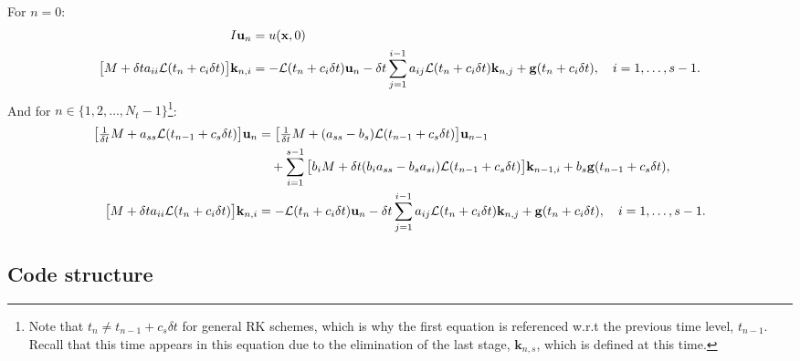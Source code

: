 \documentclass[a4paper,10pt]{article}
\begin{document}
\noindent For $n = 0$:
\begin{align}
\begin{split}
I \mathbf{u}_n &= u(\mathbf{x},0) \\
\big[ M + \delta t a_{ii} {\cal L}(t_n + c_i \delta t) \big] \mathbf{k}_{n,i} 
&= 
- {\cal L}(t_n + c_i \delta t) \mathbf{u}_{n} 
- \delta t \sum \limits_{j = 1}^{i-1} a_{ij} {\cal L}(t_n + c_i \delta t) \mathbf{k}_{n,j} 
+ \mathbf{g}(t_n + c_i \delta t),
\quad
i = 1,\ldots,s-1.
\end{split}
\end{align}
And for $n \in \{1,2,\ldots,N_t-1\}$\footnote{Note that $t_n \neq t_{n-1} + c_s \delta t $ for general RK schemes, which is why the first equation is referenced w.r.t the previous time level, $t_{n-1}$. Recall that this time appears in this equation due to the elimination of the last stage, $\mathbf{k}_{n,s}$, which is defined at this time.}:
\begin{align}
\begin{split}
\big[ 
\tfrac{1}{\delta t} M + a_{ss} {\cal L}(t_{n-1} + c_s \delta t) 
\big] 
\mathbf{u}_{n} 
&= 
\big[ 
\tfrac{1}{\delta t} M + ( a_{ss} - b_s) {\cal L}(t_{n-1} + c_s \delta t) 
\big] 
\mathbf{u}_{n-1} \\
&\quad
+ \sum \limits_{i = 1}^{s-1} 
\big[
b_i M + \delta t  (b_i a_{ss} - b_s a_{si}) {\cal L}(t_{n-1} + c_s \delta t)
\big] \mathbf{k}_{n-1,i}
+
b_s \mathbf{g}(t_{n-1} + c_s \delta t), \\
\big[ M + \delta t a_{ii} {\cal L}(t_n + c_i \delta t) \big] \mathbf{k}_{n,i} 
&= 
- {\cal L}(t_n + c_i \delta t) \mathbf{u}_{n} 
- \delta t \sum \limits_{j = 1}^{i-1} a_{ij} {\cal L}(t_n + c_i \delta t) \mathbf{k}_{n,j} 
+ \mathbf{g}(t_n + c_i \delta t),
\quad
i = 1,\ldots,s-1.
\end{split}
\end{align}




\subsection{Code structure}
\end{document}

